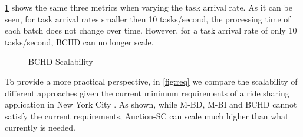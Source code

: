\cref{fig:bss} shows the same three metrics when varying the task arrival rate. As it can be seen, for task arrival rates smaller then 10 tasks/second, the processing time of each batch does not change over time. However, for a task arrival rate of only 10 tasks/second, BCHD can no longer scale.

\begin{figure}[h]
    \centering
    \vspace{-0.15in}
    \caption{BCHD Scalability}
    \label{fig:bss}
\end{figure}

To provide a more practical perspective, in \cref{fig:req} we compare the scalability of different approaches given the current minimum requirements of a ride sharing application in New York City \cite{NYCTaxi}. As shown, while M-BD, M-BI and BCHD cannot satisfy the current requirements, Auction-SC can scale much higher than what currently is needed.

